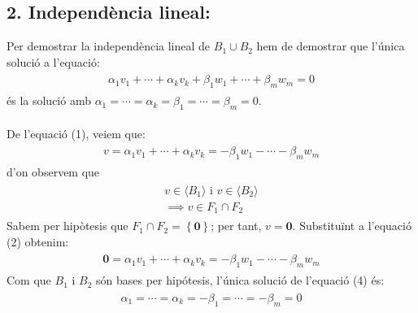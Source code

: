\documentclass[a4paper, 11pt]{article}
\begin{document}
            \subsection*{2. Independ\`encia lineal:}
                Per demostrar la independ\`encia lineal de ${B_1 \cup B_2}$ hem de demostrar que l'\'unica soluci\'o a l'equaci\'o:
                \begin{align}
                    \begin{aligned}
                        \alpha_1v_1+\cdots+\alpha_kv_k + \beta_1w_1+\cdots+\beta_mw_m = 0
                    \end{aligned}
                \end{align}
                \'es la soluci\'o amb ${\alpha_1=\cdots=\alpha_k=\beta_1=\cdots=\beta_m=0}$.
                \\\\
                De l'equaci\'o (1), veiem que:
                \begin{align}
                    \begin{aligned}
                        v = \alpha_1v_1+\cdots+\alpha_kv_k = -\beta_1w_1-\cdots-\beta_mw_m
                    \end{aligned}
                \end{align}
                d'on observem que 
                \begin{align}
                    \begin{aligned}
                        v \in \langle B_1 \rangle \text{ i } v \in \langle B_2 \rangle\\
                        \implies v \in F_1 \cap F_2
                    \end{aligned}
                \end{align}
                Sabem per hip\`otesis que ${F_1 \cap F_2 = \left\{\mathbf{0}\right\}}$; per tant, ${v = \mathbf{0}}$. Substitu\"int a l'equaci\'o (2) obtenim:
                \begin{align}
                    \begin{aligned}
                        \mathbf{0} = \alpha_1v_1+\cdots+\alpha_kv_k = -\beta_1w_1-\cdots-\beta_mw_m
                    \end{aligned}
                \end{align}
                Com que ${B_1}$ i ${B_2}$ s\'on bases per hip\'otesis, l'\'unica soluci\'o de l'equaci\'o (4) \'es:
                \begin{align}
                    \begin{aligned}
                        \alpha_1=\cdots=\alpha_k=-\beta_1=\cdots=-\beta_m=0
                    \end{aligned}
                \end{align}
\end{document}
